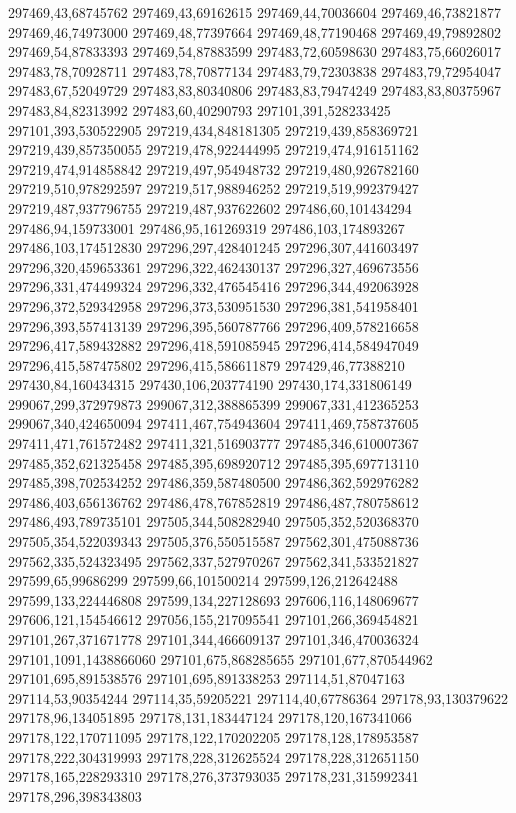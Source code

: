 297469,43,68745762
297469,43,69162615
297469,44,70036604
297469,46,73821877
297469,46,74973000
297469,48,77397664
297469,48,77190468
297469,49,79892802
297469,54,87833393
297469,54,87883599
297483,72,60598630
297483,75,66026017
297483,78,70928711
297483,78,70877134
297483,79,72303838
297483,79,72954047
297483,67,52049729
297483,83,80340806
297483,83,79474249
297483,83,80375967
297483,84,82313992
297483,60,40290793
297101,391,528233425
297101,393,530522905
297219,434,848181305
297219,439,858369721
297219,439,857350055
297219,478,922444995
297219,474,916151162
297219,474,914858842
297219,497,954948732
297219,480,926782160
297219,510,978292597
297219,517,988946252
297219,519,992379427
297219,487,937796755
297219,487,937622602
297486,60,101434294
297486,94,159733001
297486,95,161269319
297486,103,174893267
297486,103,174512830
297296,297,428401245
297296,307,441603497
297296,320,459653361
297296,322,462430137
297296,327,469673556
297296,331,474499324
297296,332,476545416
297296,344,492063928
297296,372,529342958
297296,373,530951530
297296,381,541958401
297296,393,557413139
297296,395,560787766
297296,409,578216658
297296,417,589432882
297296,418,591085945
297296,414,584947049
297296,415,587475802
297296,415,586611879
297429,46,77388210
297430,84,160434315
297430,106,203774190
297430,174,331806149
299067,299,372979873
299067,312,388865399
299067,331,412365253
299067,340,424650094
297411,467,754943604
297411,469,758737605
297411,471,761572482
297411,321,516903777
297485,346,610007367
297485,352,621325458
297485,395,698920712
297485,395,697713110
297485,398,702534252
297486,359,587480500
297486,362,592976282
297486,403,656136762
297486,478,767852819
297486,487,780758612
297486,493,789735101
297505,344,508282940
297505,352,520368370
297505,354,522039343
297505,376,550515587
297562,301,475088736
297562,335,524323495
297562,337,527970267
297562,341,533521827
297599,65,99686299
297599,66,101500214
297599,126,212642488
297599,133,224446808
297599,134,227128693
297606,116,148069677
297606,121,154546612
297056,155,217095541
297101,266,369454821
297101,267,371671778
297101,344,466609137
297101,346,470036324
297101,1091,1438866060
297101,675,868285655
297101,677,870544962
297101,695,891538576
297101,695,891338253
297114,51,87047163
297114,53,90354244
297114,35,59205221
297114,40,67786364
297178,93,130379622
297178,96,134051895
297178,131,183447124
297178,120,167341066
297178,122,170711095
297178,122,170202205
297178,128,178953587
297178,222,304319993
297178,228,312625524
297178,228,312651150
297178,165,228293310
297178,276,373793035
297178,231,315992341
297178,296,398343803
